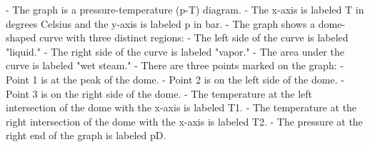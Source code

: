 - The graph is a pressure-temperature (p-T) diagram.
- The x-axis is labeled T in degrees Celsius and the y-axis is labeled p in bar.
- The graph shows a dome-shaped curve with three distinct regions:
  - The left side of the curve is labeled "liquid."
  - The right side of the curve is labeled "vapor."
  - The area under the curve is labeled "wet steam."
- There are three points marked on the graph:
  - Point 1 is at the peak of the dome.
  - Point 2 is on the left side of the dome.
  - Point 3 is on the right side of the dome.
- The temperature at the left intersection of the dome with the x-axis is labeled T1.
- The temperature at the right intersection of the dome with the x-axis is labeled T2.
- The pressure at the right end of the graph is labeled pD.